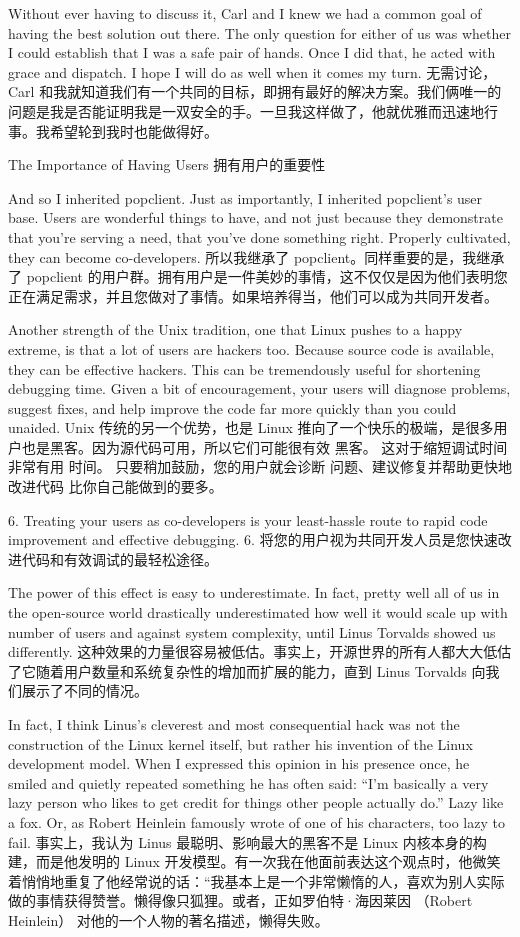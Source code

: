 \documentclass[a4paper,12pt,UTF8,twoside]{ctexbook}
\begin{document}
Without ever having to discuss it, Carl and I knew we had a common goal of having the best solution out there. The only question for either of us was whether I could establish that I was a safe pair of hands. Once I did that, he acted with grace and dispatch. I hope I will do as well when it comes my turn.
无需讨论，Carl 和我就知道我们有一个共同的目标，即拥有最好的解决方案。我们俩唯一的问题是我是否能证明我是一双安全的手。一旦我这样做了，他就优雅而迅速地行事。我希望轮到我时也能做得好。

The Importance of Having Users
拥有用户的重要性

And so I inherited popclient. Just as importantly, I inherited popclient's user base. Users are wonderful things to have, and not just because they demonstrate that you're serving a need, that you've done something right. Properly cultivated, they can become co-developers.
所以我继承了 popclient。同样重要的是，我继承了 popclient 的用户群。拥有用户是一件美妙的事情，这不仅仅是因为他们表明您正在满足需求，并且您做对了事情。如果培养得当，他们可以成为共同开发者。

Another strength of the Unix tradition, one that Linux pushes to a happy extreme, is that a lot of users are hackers too. Because source code is available, they can be effective hackers. This can be tremendously useful for shortening debugging time. Given a bit of encouragement, your users will diagnose problems, suggest fixes, and help improve the code far more quickly than you could unaided.
Unix 传统的另一个优势，也是 Linux 推向了一个快乐的极端，是很多用户也是黑客。因为源代码可用，所以它们可能很有效 黑客。 这对于缩短调试时间非常有用 时间。 只要稍加鼓励，您的用户就会诊断 问题、建议修复并帮助更快地改进代码 比你自己能做到的要多。

6. Treating your users as co-developers is your least-hassle route to rapid code improvement and effective debugging.
6. 将您的用户视为共同开发人员是您快速改进代码和有效调试的最轻松途径。

The power of this effect is easy to underestimate. In fact, pretty well all of us in the open-source world drastically underestimated how well it would scale up with number of users and against system complexity, until Linus Torvalds showed us differently.
这种效果的力量很容易被低估。事实上，开源世界的所有人都大大低估了它随着用户数量和系统复杂性的增加而扩展的能力，直到 Linus Torvalds 向我们展示了不同的情况。

In fact, I think Linus's cleverest and most consequential hack was not the construction of the Linux kernel itself, but rather his invention of the Linux development model. When I expressed this opinion in his presence once, he smiled and quietly repeated something he has often said: ``I'm basically a very lazy person who likes to get credit for things other people actually do.'' Lazy like a fox. Or, as Robert Heinlein famously wrote of one of his characters, too lazy to fail.
事实上，我认为 Linus 最聪明、影响最大的黑客不是 Linux 内核本身的构建，而是他发明的 Linux 开发模型。有一次我在他面前表达这个观点时，他微笑着悄悄地重复了他经常说的话：“我基本上是一个非常懒惰的人，喜欢为别人实际做的事情获得赞誉。懒得像只狐狸。或者，正如罗伯特·海因莱因 （Robert Heinlein） 对他的一个人物的著名描述，懒得失败。
\end{document}
